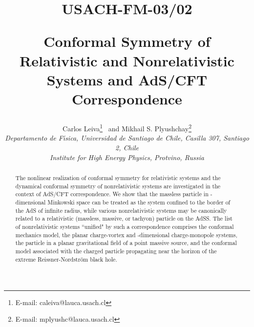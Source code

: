 \documentclass[a4paper,12pt]{article}
\begin{document}
\title{
\begin{flushright}
{\small USACH-FM-03/02}\\[1.0cm]
\end{flushright}
{\bf Conformal Symmetry of
Relativistic and Nonrelativistic
Systems and AdS/CFT Correspondence}}

\author{{\sf Carlos Leiva\coordHE{}}\thanks{
E-mail: caleiva@lauca.usach.cl}
{\sf\ and Mikhail S. Plyushchay\coordHE{}}\thanks{
E-mail: mplyushc@lauca.usach.cl}
\\
{\small {\it {}\coordHE{}Departamento de F\'{\i}sica,
Universidad de Santiago de Chile,
Casilla 307, Santiago 2, Chile}}\\
{\small {\it {}\coordHE{}Institute for High Energy Physics,
Protvino, Russia}}}
\date{}












\maketitle


\begin{abstract}
The nonlinear realization
of conformal \coordHE{} symmetry for relativistic
systems  and  the dynamical  conformal \coordHE{} symmetry
of nonrelativistic  systems
are investigated  in the context of AdS/CFT correspondence.
We show that the massless particle
in \coordHE{}-dimensional Minkowski space can be treated
as the system confined to the border
of the AdS\coordHE{} of infinite radius,
while various nonrelativistic systems
may be canonically related
to a relativistic
(massless, massive, or tachyon) particle
on the AdS\coordHE{}S\coordHE{}.
The list of nonrelativistic systems ``unified"
by such a correspondence comprises
the conformal mechanics model,
the planar charge-vortex and
\coordHE{}-dimensional
charge-monopole systems,
the particle in a planar
gravitational field of a point massive source,
and the conformal model associated with the charged
particle propagating near the horizon of the
extreme Reissner-Nordstr\"om
black hole.
\end{abstract}
\end{document}
